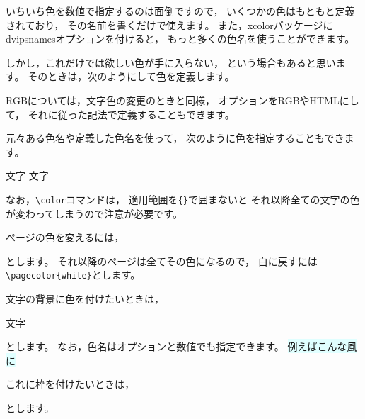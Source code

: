 いちいち色を数値で指定するのは面倒ですので，
いくつかの色はもともと定義されており，
その名前を書くだけで使えます。
また，xcolorパッケージにdvipsnamesオプションを付けると，
もっと多くの色名を使うことができます。

しかし，これだけでは欲しい色が手に入らない，
という場合もあると思います。
そのときは，次のようにして色を定義します。
\begin{ITeX}
\definecolor[gray]{x}
\definecolor[rgb]{r, g, b}
\definecolor[cmyk]{c, m, y, k}
\end{ITeX}
RGBについては，文字色の変更のときと同様，
オプションをRGBやHTMLにして，
それに従った記法で定義することもできます。

元々ある色名や定義した色名を使って，
次のように色を指定することもできます。
\begin{ITeX}
{\color{色名} 文字}
\textcolor{色名}{文字}
\end{ITeX}
なお，\verb|\color|コマンドは，
適用範囲を\verb|{}|で囲まないと
それ以降全ての文字の色が変わってしまうので注意が必要です。

ページの色を変えるには，
\begin{ITeX}
\pagecolor{色名}
\end{ITeX}
とします。
それ以降のページは全てその色になるので，
白に戻すには\verb|\pagecolor{white}|とします。

文字の背景に色を付けたいときは，
\begin{ITeX}
\colorbox{色名}{文字}
\end{ITeX}
とします。
なお，色名はオプションと数値でも指定できます。
\colorbox{lightcyan}{例えばこんな風に}

これに枠を付けたいときは，
\begin{ITeX}
\end{ITeX}
とします。

